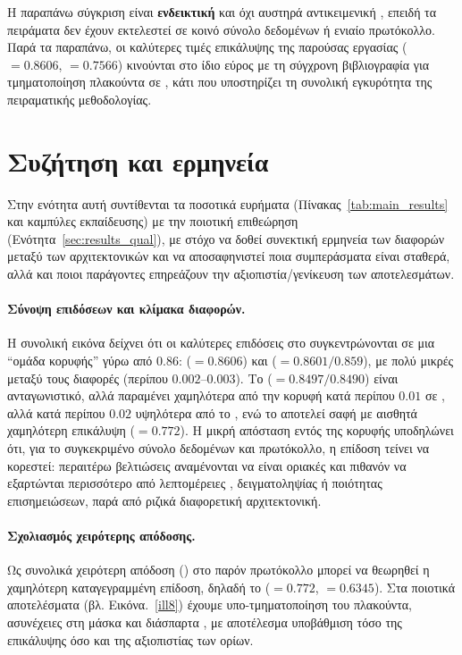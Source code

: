Η παραπάνω σύγκριση είναι \textbf{ενδεικτική} και όχι αυστηρά αντικειμενική
, επειδή τα πειράματα δεν έχουν εκτελεστεί σε κοινό σύνολο
δεδομένων ή ενιαίο πρωτόκολλο. 
Παρά τα παραπάνω, οι καλύτερες τιμές επικάλυψης της παρούσας εργασίας
($=0.8606$, $=0.7566$) κινούνται στο ίδιο εύρος με τη
σύγχρονη βιβλιογραφία για τμηματοποίηση πλακούντα σε , κάτι που
υποστηρίζει τη συνολική εγκυρότητα της πειραματικής μεθοδολογίας.

\section{Συζήτηση και ερμηνεία}
 
\label{sec:results_discussion}

Στην ενότητα αυτή συντίθενται τα ποσοτικά ευρήματα (Πίνακας~\ref{tab:main_results}
και καμπύλες εκπαίδευσης) με την ποιοτική επιθεώρηση (Ενότητα~\ref{sec:results_qual}),
με στόχο να δοθεί συνεκτική ερμηνεία των διαφορών μεταξύ των αρχιτεκτονικών και
να αποσαφηνιστεί ποια συμπεράσματα είναι σταθερά, αλλά και ποιοι παράγοντες
επηρεάζουν την αξιοπιστία/γενίκευση των αποτελεσμάτων.

\paragraph{Σύνοψη επιδόσεων και κλίμακα διαφορών.}
Η συνολική εικόνα δείχνει ότι οι καλύτερες επιδόσεις στο 
συγκεντρώνονται σε μια ``ομάδα κορυφής'' γύρω από  $0.86$:
 ($=0.8606$) και 
($=0.8601/0.859$), με πολύ μικρές μεταξύ τους διαφορές
(περίπου $0.002$--$0.003$). Το 
($=0.8497/0.8490$) είναι
ανταγωνιστικό, αλλά παραμένει χαμηλότερα από την κορυφή κατά περίπου $0.01$ σε
, αλλά κατά περίπου $0.02$ υψηλότερα από το , 
ενώ το  αποτελεί σαφή  με αισθητά χαμηλότερη
επικάλυψη ($=0.772$). Η μικρή απόσταση εντός της κορυφής υποδηλώνει
ότι, για το συγκεκριμένο σύνολο δεδομένων και πρωτόκολλο, η επίδοση τείνει να
κορεστεί: περαιτέρω βελτιώσεις αναμένονται να είναι οριακές και πιθανόν να
εξαρτώνται περισσότερο από λεπτομέρειες , δειγματοληψίας
 ή ποιότητας επισημειώσεων, παρά από ριζικά διαφορετική
αρχιτεκτονική.

\paragraph{Σχολιασμός χειρότερης απόδοσης.}
Ως συνολικά χειρότερη απόδοση () στο παρόν πρωτόκολλο μπορεί να θεωρηθεί η χαμηλότερη
καταγεγραμμένη επίδοση, δηλαδή το  ($=0.772$, $=0.6345$).
Στα ποιοτικά αποτελέσματα (βλ. Εικόνα.~\ref{ill8}) έχουμε υπο-τμηματοποίηση του πλακούντα,
ασυνέχειες στη μάσκα και διάσπαρτα , με αποτέλεσμα
υποβάθμιση τόσο της επικάλυψης όσο και της αξιοπιστίας των ορίων.

